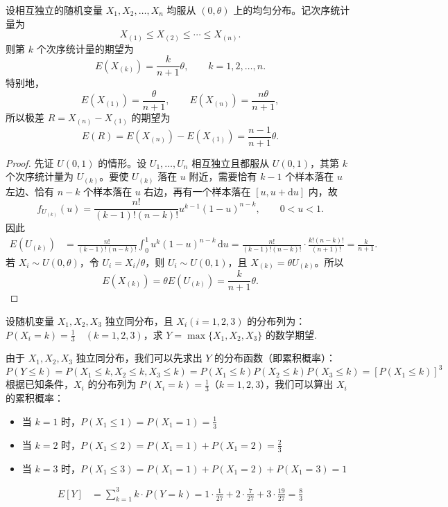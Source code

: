 \documentclass[lang=cn,11pt]{elegantbook}
\begin{document}
\begin{proposition}[均匀分布次序统计量的通用结论]\label{prop:order-stat-uniform}
设相互独立的随机变量 \(X_1, X_2, \dots, X_n\) 均服从 \((0, \theta)\) 上的均匀分布。记次序统计量为
\[
X_{(1)}\le X_{(2)}\le \cdots \le X_{(n)}.
\]
则第 \(k\) 个次序统计量的期望为
\[
E(X_{(k)})=\frac{k}{n+1}\theta,\qquad k=1,2,\dots,n.
\]
特别地，
\[
E(X_{(1)})=\frac{\theta}{n+1},\qquad
E(X_{(n)})=\frac{n\theta}{n+1},
\]
所以极差 \(R=X_{(n)}-X_{(1)}\) 的期望为
\[
E(R)=E(X_{(n)})-E(X_{(1)})=\frac{n-1}{n+1}\theta.
\]
\end{proposition}

\begin{proof}
先证 \(U(0,1)\) 的情形。设 \(U_1,\dots,U_n\) 相互独立且都服从 \(U(0,1)\)，其第 \(k\) 个次序统计量为 \(U_{(k)}\)。要使 \(U_{(k)}\) 落在 \(u\) 附近，需要恰有 \(k-1\) 个样本落在 \(u\) 左边、恰有 \(n-k\) 个样本落在 \(u\) 右边，再有一个样本落在 \([u,u+\mathrm{d}u]\) 内，故
\[
f_{U_{(k)}}(u)=\frac{n!}{(k-1)!(n-k)!}u^{k-1}(1-u)^{n-k},\qquad 0<u<1.
\]
因此
\[
\begin{aligned}
E(U_{(k)})
&=\frac{n!}{(k-1)!(n-k)!}\int_0^1 u^k(1-u)^{n-k}\,\mathrm{d}u=\frac{n!}{(k-1)!(n-k)!}\cdot \frac{k!(n-k)!}{(n+1)!}
=\frac{k}{n+1}.
\end{aligned}
\]
若 \(X_i\sim U(0,\theta)\)，令 \(U_i=X_i/\theta\)，则 \(U_i\sim U(0,1)\)，且 \(X_{(k)}=\theta U_{(k)}\)。所以
\[
E(X_{(k)})=\theta E(U_{(k)})=\frac{k}{n+1}\theta.
\]
\end{proof}


\begin{exercise}
设随机变量 $X_1, X_2, X_3$ 独立同分布，且 $X_i (i=1,2,3)$ 的分布列为：$P(X_i = k) = \frac{1}{3} \quad (k=1,2,3)$，求 $Y = \max\{X_1, X_2, X_3\}$ 的数学期望.
\end{exercise}
\begin{solution}
由于 $X_1, X_2, X_3$ 独立同分布，我们可以先求出 $Y$ 的分布函数（即累积概率）：
$$P(Y \le k) = P(X_1 \le k, X_2 \le k, X_3 \le k) = P(X_1 \le k)P(X_2 \le k)P(X_3 \le k) = [P(X_1 \le k)]^3$$
根据已知条件，$X_i$ 的分布列为 $P(X_i = k) = \frac{1}{3}$（$k=1,2,3$），我们可以算出 $X_i$ 的累积概率：
\begin{itemize}
\item 当 $k=1$ 时，$P(X_1 \le 1) = P(X_1 = 1) = \frac{1}{3}$
\item 当 $k=2$ 时，$P(X_1 \le 2) = P(X_1 = 1) + P(X_1 = 2) = \frac{2}{3}$
\item 当 $k=3$ 时，$P(X_1 \le 3) = P(X_1 = 1) + P(X_1 = 2) + P(X_1 = 3) = 1$
\end{itemize}
\begin{align*}
E[Y] &= \sum_{k=1}^{3} k \cdot P(Y = k) = 1 \cdot \frac{1}{27} + 2 \cdot \frac{7}{27} + 3 \cdot \frac{19}{27} = \frac{8}{3}
\end{align*}
\end{solution}
\end{document}
